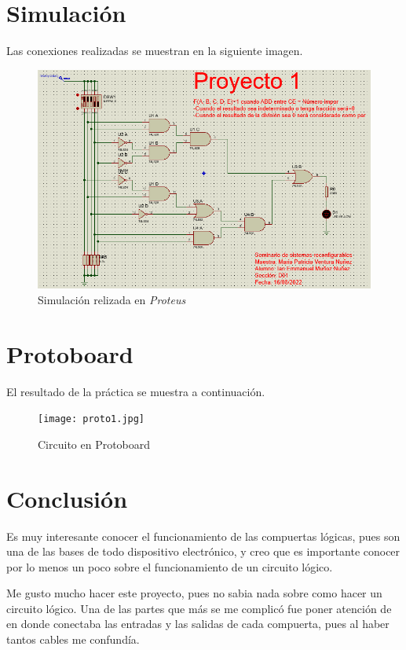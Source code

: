 \documentclass[12pt, oneside, openany]{article}
\begin{document}
\section{Simulación}
{\sffamily\Large
    \hspace{0.5cm} Las conexiones realizadas se muestran en la siguiente imagen.
    \begin{figure}[h!]
        \centering
        \includegraphics[width=0.7\linewidth]{proteus.png}
        \caption{\sffamily Simulación relizada en \emph{Proteus\texttrademark}}
        \label{fig:simulacion}
    \end{figure}
    
}

\newpage
\section{Protoboard}
{\sffamily\Large
    \hspace{0.5cm} El resultado de la práctica se muestra a continuación.
    \begin{figure}[h!]
        \centering
        \texttt{[image: proto1.jpg]}
        \caption{\sffamily Circuito en Protoboard}
        \label{fig:proto}
    \end{figure}
    
}

\section{Conclusión}
{\sffamily\Large
    \hspace{0.5cm} Es muy interesante conocer el funcionamiento de las compuertas lógicas, pues son una de las bases de todo dispositivo electrónico, y creo que es importante conocer por lo menos un poco sobre el funcionamiento de un circuito lógico.
    
    \hspace{0.5cm} Me gusto mucho hacer este proyecto, pues no sabia nada sobre como hacer un circuito lógico. Una de las partes que más se me complicó fue poner atención de en donde conectaba las entradas y las salidas de cada compuerta, pues al haber tantos cables me confundía.
    
}
\end{document}
